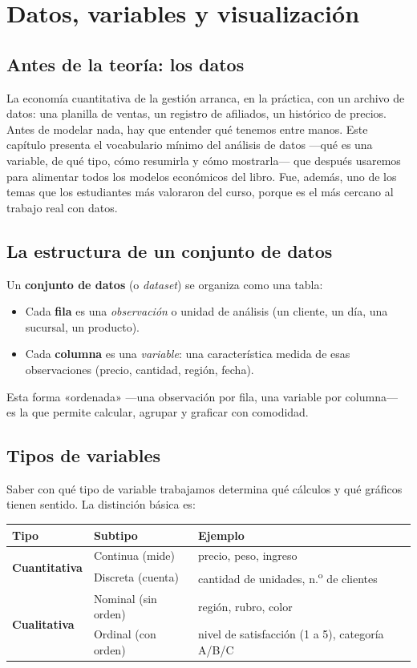 \chapter{Datos, variables y visualización}
\label{cap:datos}

\section{Antes de la teoría: los datos}

La economía cuantitativa de la gestión arranca, en la práctica, con un archivo de datos: una planilla de ventas, un registro de afiliados, un histórico de precios. Antes de modelar nada, hay que entender qué tenemos entre manos. Este capítulo presenta el vocabulario mínimo del análisis de datos —qué es una variable, de qué tipo, cómo resumirla y cómo mostrarla— que después usaremos para alimentar todos los modelos económicos del libro. Fue, además, uno de los temas que los estudiantes más valoraron del curso, porque es el más cercano al trabajo real con datos.

\section{La estructura de un conjunto de datos}

Un \textbf{conjunto de datos} (o \emph{dataset}) se organiza como una tabla:
\begin{itemize}
  \item Cada \textbf{fila} es una \emph{observación} o unidad de análisis (un cliente, un día, una sucursal, un producto).
  \item Cada \textbf{columna} es una \emph{variable}: una característica medida de esas observaciones (precio, cantidad, región, fecha).
\end{itemize}
Esta forma «ordenada» —una observación por fila, una variable por columna— es la que permite calcular, agrupar y graficar con comodidad.

\section{Tipos de variables}

Saber con qué tipo de variable trabajamos determina qué cálculos y qué gráficos tienen sentido. La distinción básica es:

\begin{center}
\renewcommand{\arraystretch}{1.3}
\begin{tabular}{p{3.2cm} p{4.0cm} p{5.0cm}}
\toprule
\textbf{Tipo} & \textbf{Subtipo} & \textbf{Ejemplo} \\
\midrule
\multirow{2}{*}{\textbf{Cuantitativa}} & Continua (mide) & precio, peso, ingreso \\
 & Discreta (cuenta) & cantidad de unidades, n.\textsuperscript{o} de clientes \\
\midrule
\multirow{2}{*}{\textbf{Cualitativa}} & Nominal (sin orden) & región, rubro, color \\
 & Ordinal (con orden) & nivel de satisfacción (1 a 5), categoría A/B/C \\
\bottomrule
\end{tabular}
\end{center}


